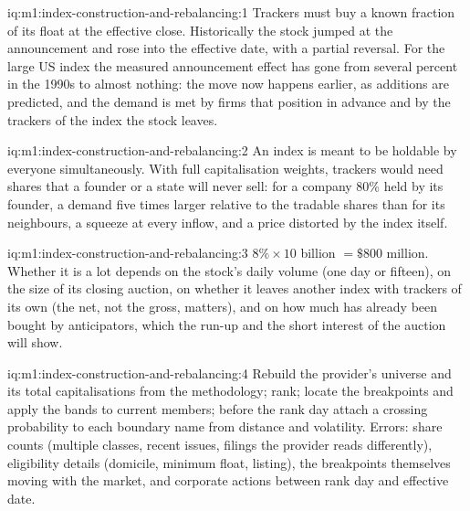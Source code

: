 \begin{solution}{iq:m1:index-construction-and-rebalancing:1}
Trackers must buy a known fraction of its float at the effective close.
Historically the stock jumped at the announcement and rose into the effective
date, with a partial reversal. For the large US index the measured
announcement effect has gone from several percent in the 1990s to almost
nothing: the move now happens earlier, as additions are predicted, and the
demand is met by firms that position in advance and by the trackers of the
index the stock leaves.
\end{solution}

\begin{solution}{iq:m1:index-construction-and-rebalancing:2}
An index is meant to be holdable by everyone simultaneously. With full
capitalisation weights, trackers would need shares that a founder or a state
will never sell: for a company 80\% held by its founder, a demand five times
larger relative to the tradable shares than for its neighbours, a squeeze at
every inflow, and a price distorted by the index itself.
\end{solution}

\begin{solution}{iq:m1:index-construction-and-rebalancing:3}
$8\% \times 10$ billion $= \$800$ million. Whether it is a lot depends on the
stock's daily volume (one day or fifteen), on the size of its closing
auction, on whether it leaves another index with trackers of its own (the
net, not the gross, matters), and on how much has already been bought by
anticipators, which the run-up and the short interest of the auction will
show.
\end{solution}

\begin{solution}{iq:m1:index-construction-and-rebalancing:4}
Rebuild the provider's universe and its total capitalisations from the
methodology; rank; locate the breakpoints and apply the bands to current
members; before the rank day attach a crossing probability to each boundary
name from distance and volatility. Errors: share counts (multiple classes,
recent issues, filings the provider reads differently), eligibility details
(domicile, minimum float, listing), the breakpoints themselves moving with
the market, and corporate actions between rank day and effective date.
\end{solution}

